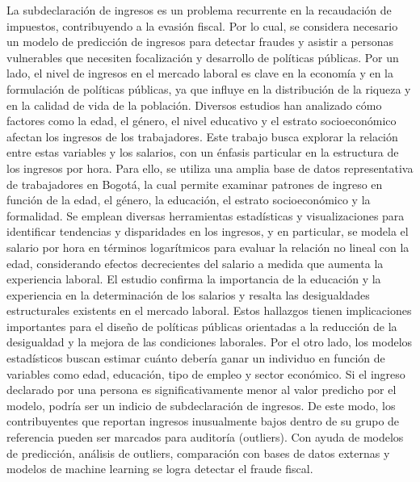 \documentclass[12pt,a4paper,onecolumn]{article}
\begin{document}
\begin{enumerate}
    La subdeclaraci\'on de ingresos es un problema recurrente en la recaudaci\'on de impuestos, contribuyendo a la evasi\'on fiscal. Por lo cual, se considera necesario un modelo de predicci\'on de ingresos para detectar fraudes y asistir a personas vulnerables que necesiten focalizaci\'on y desarrollo de pol\'iticas p\'ublicas. Por un lado, el nivel de ingresos en el mercado laboral es clave en la econom\'ia y en la formulaci\'on de pol\'iticas p\'ublicas, ya que influye en la distribuci\'on de la riqueza y en la calidad de vida de la poblaci\'on. Diversos estudios han analizado c\'omo factores como la edad, el g\'enero, el nivel educativo y el estrato socioecon\'omico afectan los ingresos de los trabajadores. Este trabajo busca explorar la relaci\'on entre estas variables y los salarios, con un \'enfasis particular en la estructura de los ingresos por hora. Para ello, se utiliza una amplia base de datos representativa de trabajadores en Bogot\'a, la cual permite examinar patrones de ingreso en funci\'on de la edad, el g\'enero, la educaci\'on, el estrato socioecon\'omico y la formalidad. Se emplean diversas herramientas estad\'isticas y visualizaciones para identificar tendencias y disparidades en los ingresos, y en particular, se modela el salario por hora en t\'erminos logar\'itmicos para evaluar la relaci\'on no lineal con la edad, considerando efectos decrecientes del salario a medida que aumenta la experiencia laboral. El estudio confirma la importancia de la educaci\'on y la experiencia en la determinaci\'on de los salarios y resalta las desigualdades estructurales existents en el mercado laboral. Estos hallazgos tienen implicaciones importantes para el dise\~no de pol\'iticas p\'ublicas orientadas a la reducci\'on de la desigualdad y la mejora de las condiciones laborales. Por el otro lado, los modelos estad\'isticos buscan estimar cu\'anto deber\'ia ganar un individuo en funci\'on de variables como edad, educaci\'on, tipo de empleo y sector econ\'omico. Si el ingreso declarado por una persona es significativamente menor al valor predicho por el modelo, podr\'ia ser un indicio de subdeclaraci\'on de ingresos. De este modo, los contribuyentes que reportan ingresos inusualmente bajos dentro de su grupo de referencia pueden ser marcados para auditor\'ia (outliers). Con ayuda de modelos de predicci\'on, an\'alisis de outliers, comparaci\'on con bases de datos externas y modelos de machine learning se logra detectar el fraude fiscal.


\end{enumerate}
\end{document}
